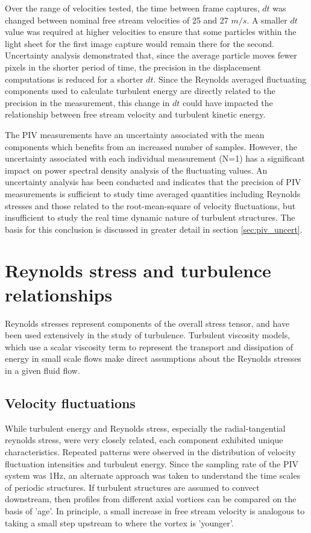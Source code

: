 Over the range of velocities tested, the time between frame captures, $dt$ was 
changed between nominal free stream velocities of 25 and 27 $m/s$. A smaller 
$dt$ value was required at higher velocities to ensure that some particles 
within the light sheet for the first image capture would remain there for the 
second. Uncertainty analysis demonstrated that, since the average particle 
moves fewer pixels in the shorter period of time, the precision in the 
displacement computations is reduced for a shorter $dt$. Since the Reynolds 
averaged fluctuating components used to calculate turbulent energy are directly 
related to the precision in the measurement, this change in $dt$ could have 
impacted the relationship between free stream velocity and turbulent kinetic 
energy.

The PIV measurements have an uncertainty associated with the mean components 
which benefits from an increased number of samples. However, the 
uncertainty associated with each individual measurement (N=1) has a 
significant impact on power spectral density analysis of the fluctuating 
values. An uncertainty analysis has been conducted and indicates that the 
precision of PIV measurements is sufficient to study time averaged quantities 
including Reynolds stresses and those related to the root-mean-square of 
velocity fluctuations, but insufficient to study the real time dynamic nature 
of turbulent structures. The basis for this conclusion is discussed in greater 
detail in section \ref{sec:piv_uncert}.

\section{Reynolds stress and turbulence relationships}

Reynolds stresses represent components of the overall stress tensor, and have 
been used extensively in the study of turbulence. Turbulent viscosity models, 
which use a scalar viscosity term to represent the transport and dissipation of 
energy in small scale flows make direct assumptions about the Reynolds stresses 
in a given fluid flow. 

\clearpage
\subsection{Velocity fluctuations}

While turbulent energy and Reynolds stress, especially the radial-tangential 
reynolds stress, were very closely related, each component exhibited unique 
characteristics. Repeated patterns were observed in the distribution of 
velocity fluctuation intensities and turbulent energy. Since the sampling rate 
of the PIV system was 1Hz, an alternate approach was taken to understand the 
time scales of periodic structures. If turbulent structures are assumed to 
convect downstream, then profiles from different axial vortices can be compared 
on the basis of 'age'. In principle, a small increase in free stream velocity 
is analogous to taking a small step upstream to where the vortex is 'younger'. 

